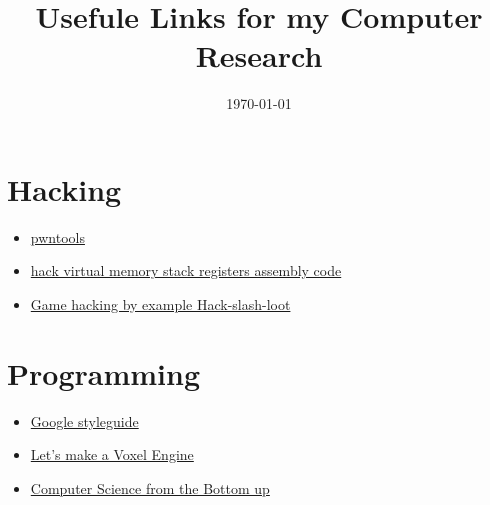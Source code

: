 \documentclass[a4paper, 12pt]{scrartcl}
\title{Usefule Links for my Computer Research}
\date{\today}
\begin{document}
    \maketitle
    \tableofcontents
    \section {Hacking}
    \begin{itemize}
        \item \href{https://github.com/Gallopsled/pwntools}{pwntools} 
        \item \href{https://blog.holbertonschool.com/hack-virtual-memory-stack-registers-assembly-code/}{hack virtual memory stack registers assembly code}
        \item \href{https://0x00sec.org/t/game-hacking-hack-slash-loot/3711}{Game hacking by example Hack-slash-loot}
    \end{itemize}
    \section {Programming}
    \begin{itemize}
        \item \href{https://google.github.io/styleguide/}{Google styleguide}
        \item \href{https://sites.google.com/site/letsmakeavoxelengine/home}{Let's make a Voxel Engine}
        \item \href{http://www.bottomupcs.com/}{Computer Science from the Bottom up}
    \end{itemize}
\end{document}
